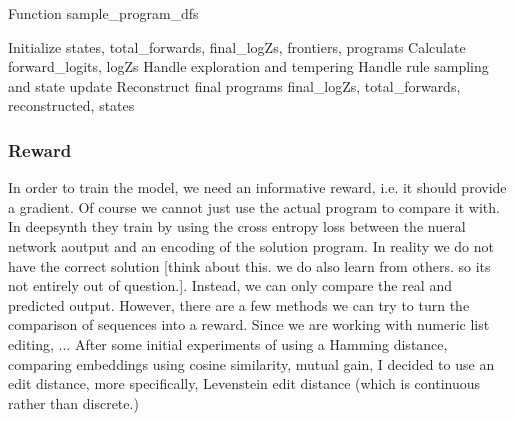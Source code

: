\begin{algorithm}
\caption{Function sample\_program\_dfs}
\begin{algorithmic}[1]
    \State Initialize states, total\_forwards, final\_logZs, frontiers, programs
        \State Calculate forward\_logits, logZs
        \State Handle exploration and tempering
                \State Handle rule sampling and state update
            \EndIf
        \EndFor
    \EndWhile
        \State Reconstruct final programs
        \State \Return final\_logZs, total\_forwards, reconstructed, states
    \EndIf
\EndFunction
\end{algorithmic}
\end{algorithm}


































\subsubsection{Reward}

In order to train the model, we need an informative reward, i.e. it should provide a gradient.
Of course we cannot just use the actual program to compare it with. In deepsynth they train by using the cross entropy loss between the nueral network aoutput and an encoding of the solution program. In reality we do not have the correct solution [think about this. we do also learn from others. so its not entirely out of question.]. Instead, we can only compare the real and predicted output. However, there are a few methods we can try to turn the comparison of sequences into a reward. Since we are working with numeric list editing, ...
After some initial experiments of using a Hamming distance, comparing embeddings using cosine similarity, mutual gain, I decided to use an edit distance, more specifically, Levenstein edit distance (which is continuous rather than discrete.) 

